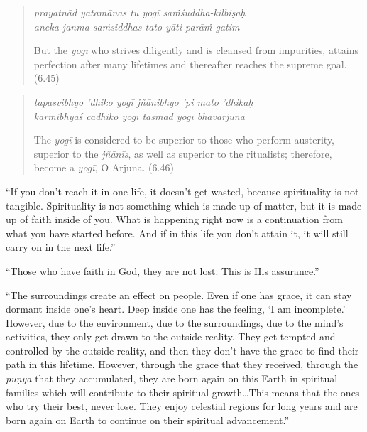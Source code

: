 \documentclass[12pt, twoside, openright]{memoir}
\begin{document}
\par
\begin{verse}
\textit{prayatnād yatamānas tu yogī saṁśuddha-kilbiṣaḥ} \\
\textit{aneka-janma-saṁsiddhas tato yāti parāṁ gatim}

\noindent But the \textit{yogī} who strives diligently and is cleansed from impurities, attains perfection after many lifetimes and thereafter reaches the supreme goal. (6.45)
\end{verse}
\par



\par
\begin{verse}
\textit{tapasvibhyo ’dhiko yogī jñānibhyo ’pi mato ’dhikaḥ} \\
\textit{karmibhyaś cādhiko yogī tasmād yogī bhavārjuna}

\noindent The \textit{yogī} is considered to be superior to those who perform austerity, superior to the \textit{jñānīs}, as well as superior to the ritualists; therefore, become a \textit{yogī}, O Arjuna. (6.46)
\end{verse}
\par


\enquote{If you don’t reach it in one life, it doesn’t get wasted, because spirituality is not tangible. Spirituality is not something which is made up of matter, but it is made up of faith inside of you. What is happening right now is a continuation from what you have started before. And if in this life you don’t attain it, it will still carry on in the next life.}

\enquote{Those who have faith in God, they are not lost. This is His assurance.}

\enquote{The surroundings create an effect on people. Even if one has grace, it can stay dormant inside one’s heart. Deep inside one has the feeling, \enquote{I am incomplete.} However, due to the environment, due to the surroundings, due to the mind’s activities, they only get drawn to the outside reality. They get tempted and controlled by the outside reality, and then they don’t have the grace to find their path in this lifetime. However, through the grace that they received, through the \textit{puṇya} that they accumulated, they are born again on this Earth in spiritual families which will contribute to their spiritual growth\ldots This means that the ones who try their best, never lose. They enjoy celestial regions for long years and are born again on Earth to continue on their spiritual advancement.}
\end{document}
